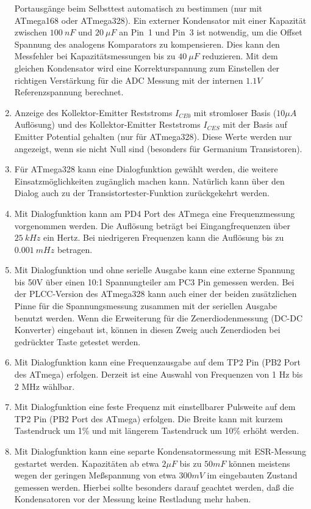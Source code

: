\begin{enumerate}
Portausgänge beim Selbsttest automatisch zu bestimmen (nur mit ATmega168 oder ATmega328).
Ein externer Kondensator mit einer Kapazität zwischen \(100~nF\) und \(20~\mu F\) an Pin~1 und Pin~3 ist notwendig, 
um die Offset Spannung des analogens Komparators zu kompensieren.
Dies kann den Messfehler bei Kapazitätsmessungen bis zu \(40~\mu F\) reduzieren.
Mit dem gleichen Kondensator wird eine Korrekturspannung zum Einstellen der richtigen Verstärkung für
die ADC Messung mit der internen \(1.1V\) Referenzspannung berechnet.
\item Anzeige des Kollektor-Emitter Reststroms \(I_{CE0}\) mit stromloser Basis (\(10\mu A\) Auflösung) und
des Kollektor-Emitter Reststroms \(I_{CES}\) mit der Basis auf Emitter Potential gehalten (nur für ATmega328).
Diese Werte werden nur angezeigt, wenn sie nicht Null sind (besonders für Germanium Transistoren).
\item Für ATmega328 kann eine Dialogfunktion gewählt werden, die weitere Einsatzmöglichkeiten zugänglich machen kann.
Natürlich kann über den Dialog auch zu der Transistortester-Funktion zurückgekehrt werden.
\item Mit Dialogfunktion kann am PD4 Port des ATmega eine Frequenzmessung vorgenommen werden.
Die Auflösung beträgt bei Eingangfrequenzen über \(25~kHz\) ein Hertz.
Bei niedrigeren Frequenzen kann die Auflösung bis zu \(0.001~mHz\) betragen.
\item Mit Dialogfunktion und ohne serielle Ausgabe kann eine externe Spannung bis 50V über einen
10:1 Spannungteiler am PC3 Pin gemessen werden. Bei der PLCC-Version des ATmega328 kann auch einer der beiden
zusätzlichen Pinne für die Spannungsmessung zusammen mit der seriellen Ausgabe benutzt werden.
Wenn die Erweiterung für die Zenerdiodenmessung (DC-DC Konverter)
eingebaut ist, können in diesen Zweig auch Zenerdioden bei gedrückter Taste getestet werden.
\item Mit Dialogfunktion kann eine Frequenzausgabe auf dem TP2 Pin (PB2 Port des ATmega) erfolgen.
Derzeit ist eine Auswahl von Frequenzen von 1 Hz bis 2 MHz wählbar.
\item Mit Dialogfunktion eine feste Frequenz mit einstellbarer Pulsweite auf dem TP2 Pin (PB2 Port des ATmega) erfolgen.
Die Breite kann mit kurzem Tastendruck um 1\% und mit längerem Tastendruck um 10\% erhöht werden.
\item Mit Dialogfunktion kann eine separte Kondensatormessung mit ESR-Messung gestartet werden.
 Kapazitäten ab etwa \(2 \mu F\) bis zu \(50 mF\) können meistens wegen der geringen Meßspannung von etwa \(300 mV\)
 im eingebauten Zustand gemessen werden.
 Hierbei sollte besonders darauf geachtet werden, daß die Kondensatoren vor der Messung keine Restladung mehr haben.

\end{enumerate}

